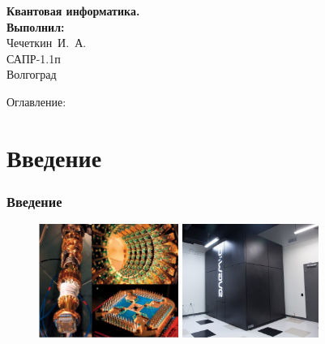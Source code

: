 \documentclass[12pt,pdf]{beamer}
\renewcommand{\~}[1]{\widetilde{#1}}
\begin{document}
  \begin{frame}
    \begin{center}
    \vspace{3.0cm}
    \normalsize
    \textbf{Квантовая информатика.} \\
    \vspace{1.5cm}
    \raggedleft\small\textbf{Выполнил:}\\Чечеткин~И.~А.\\САПР-1.1п\\
    \vspace{1.8cm}
    \vspace{\fill}
    \centering Волгоград \the\year
    \end{center}
  \end{frame}

  \begin{frame}
    Оглавление:
    \tableofcontents
  \end{frame}

  \section{Введение}
  \begin{frame}
    \frametitle{Введение}
    \begin{figure}
      \center
      \includegraphics[height=10em]{picture} \hfill
      \includegraphics[height=10em]{d-wave}
    \end{figure}
  \end{frame}
\end{document}

